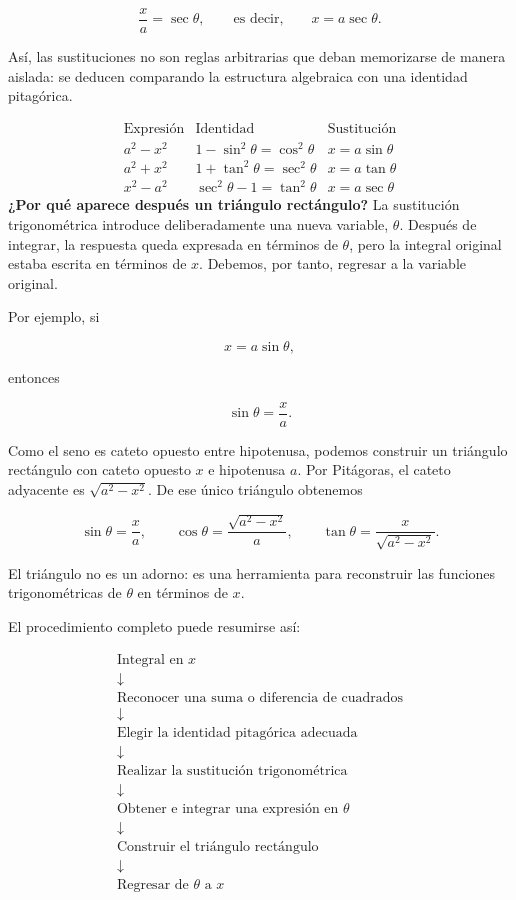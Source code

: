 \documentclass[12pt]{article}
\theoremstyle{definition}
\theoremstyle{remark}
\begin{document}
\[
\frac{x}{a}=\sec\theta,
\qquad\text{es decir,}\qquad
\boxed{x=a\sec\theta}.
\]

Así, las sustituciones no son reglas arbitrarias que deban memorizarse de
manera aislada: se deducen comparando la estructura algebraica con una
identidad pitagórica.

\[
\boxed{
\begin{array}{c|c|c}
\text{Expresión} & \text{Identidad} & \text{Sustitución}\\ \hline
 a^2-x^2 & 1-\sin^2\theta=\cos^2\theta & x=a\sin\theta\\[2mm]
 a^2+x^2 & 1+\tan^2\theta=\sec^2\theta & x=a\tan\theta\\[2mm]
 x^2-a^2 & \sec^2\theta-1=\tan^2\theta & x=a\sec\theta
\end{array}}
\]
\textbf{¿Por qué aparece después un triángulo rectángulo?}
La sustitución trigonométrica introduce deliberadamente una nueva variable,
$\theta$. Después de integrar, la respuesta queda expresada en términos de
$\theta$, pero la integral original estaba escrita en términos de $x$.
Debemos, por tanto, regresar a la variable original.

Por ejemplo, si

\[
x=a\sin\theta,
\]

entonces

\[
\sin\theta=\frac{x}{a}.
\]

Como el seno es cateto opuesto entre hipotenusa, podemos construir un
triángulo rectángulo con cateto opuesto $x$ e hipotenusa $a$. Por Pitágoras,
el cateto adyacente es $\sqrt{a^2-x^2}$. De ese único triángulo obtenemos

\[
\sin\theta=\frac{x}{a},\qquad
\cos\theta=\frac{\sqrt{a^2-x^2}}{a},\qquad
\tan\theta=\frac{x}{\sqrt{a^2-x^2}}.
\]

El triángulo no es un adorno: es una herramienta para reconstruir las
funciones trigonométricas de $\theta$ en términos de $x$.

El procedimiento completo puede resumirse así:

\[
\boxed{
\begin{array}{c}
\text{Integral en }x\\
\downarrow\\
\text{Reconocer una suma o diferencia de cuadrados}\\
\downarrow\\
\text{Elegir la identidad pitagórica adecuada}\\
\downarrow\\
\text{Realizar la sustitución trigonométrica}\\
\downarrow\\
\text{Obtener e integrar una expresión en }\theta\\
\downarrow\\
\text{Construir el triángulo rectángulo}\\
\downarrow\\
\text{Regresar de }\theta\text{ a }x
\end{array}}
\]
\end{document}
